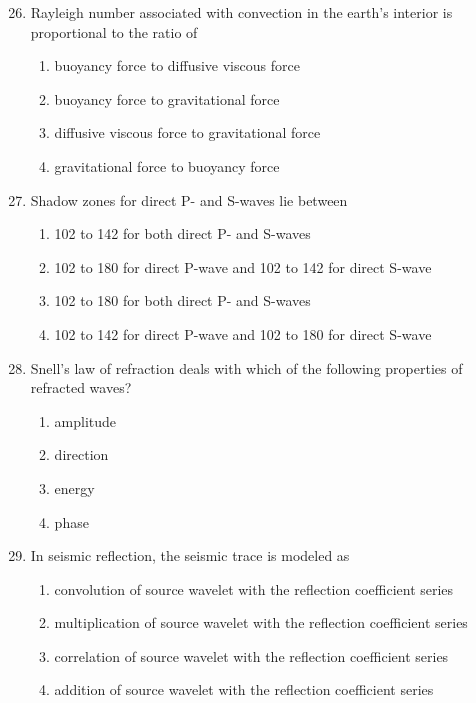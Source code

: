 \documentclass[journal,12pt,onecolumn]{IEEEtran}
\theoremstyle{remark}
\begin{document}
\begin{enumerate}
\setcounter{enumi}{25}










\item Rayleigh number associated with convection in the earth's interior is proportional to the ratio of
\begin{enumerate}
\item buoyancy force to diffusive viscous force  
\item buoyancy force to gravitational force  
\item diffusive viscous force to gravitational force  
\item gravitational force to buoyancy force  
\end{enumerate}

\item Shadow zones for direct P- and S-waves lie between
\begin{enumerate}
  \item 102\textdegree{} to 142\textdegree{} for both direct P- and S-waves  
  \item 102\textdegree{} to 180\textdegree{} for direct P-wave and 102\textdegree{} to 142\textdegree{} for direct S-wave  
  \item 102\textdegree{} to 180\textdegree{} for both direct P- and S-waves  
  \item 102\textdegree{} to 142\textdegree{} for direct P-wave and 102\textdegree{} to 180\textdegree{} for direct S-wave  
\end{enumerate}

\item Snell's law of refraction deals with which of the following properties of refracted waves?
\begin{multicols}{4}
\begin{enumerate}
\item amplitude  
\item direction  
\item energy  
\item phase  
\end{enumerate}
\end{multicols}

\item In seismic reflection, the seismic trace is modeled as
\begin{enumerate}
\item convolution of source wavelet with the reflection coefficient series  
\item multiplication of source wavelet with the reflection coefficient series  
\item correlation of source wavelet with the reflection coefficient series  
\item addition of source wavelet with the reflection coefficient series  
\end{enumerate}


\end{enumerate}
\end{document}

